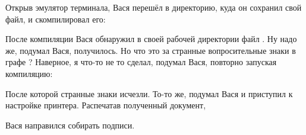 Открыв эмулятор терминала, Вася перешёл в директорию, куда он сохранил свой
файл, и скомпилировал его:


После компиляции Вася обнаружил в своей рабочей директории файл
. Ну надо же, подумал Вася, получилось. Но что это за странные
вопросительные знаки в графе ? Наверное, я что-то не то сделал,
подумал Вася, повторно запуская компиляцию:


После которой странные знаки исчезли. То-то же, подумал Вася и приступил к
настройке принтера. Распечатав полученный документ,

\begin{center}
\end{center}

Вася направился собирать подписи.
